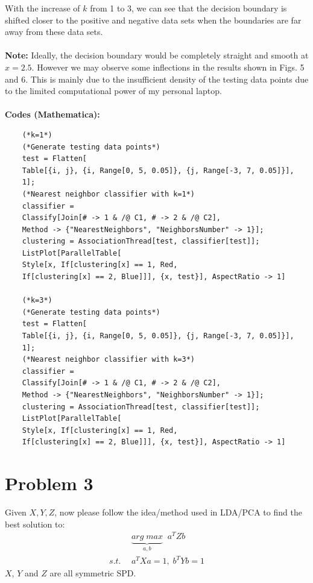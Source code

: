 \documentclass[11pt]{article}
\begin{document}
With the increase of $k$ from 1 to 3, we can see that the decision boundary is shifted closer to the positive and negative data sets when the boundaries are far away from these data sets.\\ \\
\textbf{Note: }Ideally, the decision boundary would be completely straight and smooth at $x=2.5$. However we may observe some inflections in the results shown in Figs. 5 and 6. This is mainly due to the insufficient density of the testing data points due to the limited computational power of my personal laptop.\\ \\
\textbf{Codes (Mathematica): }
\begin{verbatim}
	(*k=1*)
	(*Generate testing data points*)
	test = Flatten[
	Table[{i, j}, {i, Range[0, 5, 0.05]}, {j, Range[-3, 7, 0.05]}], 
	1];
	(*Nearest neighbor classifier with k=1*)
	classifier = 
	Classify[Join[# -> 1 & /@ C1, # -> 2 & /@ C2], 
	Method -> {"NearestNeighbors", "NeighborsNumber" -> 1}];
	clustering = AssociationThread[test, classifier[test]];
	ListPlot[ParallelTable[
	Style[x, If[clustering[x] == 1, Red, 
	If[clustering[x] == 2, Blue]]], {x, test}], AspectRatio -> 1]
	
	(*k=3*)
	(*Generate testing data points*)
	test = Flatten[
	Table[{i, j}, {i, Range[0, 5, 0.05]}, {j, Range[-3, 7, 0.05]}], 
	1];
	(*Nearest neighbor classifier with k=3*)
	classifier = 
	Classify[Join[# -> 1 & /@ C1, # -> 2 & /@ C2], 
	Method -> {"NearestNeighbors", "NeighborsNumber" -> 1}];
	clustering = AssociationThread[test, classifier[test]];
	ListPlot[ParallelTable[
	Style[x, If[clustering[x] == 1, Red, 
	If[clustering[x] == 2, Blue]]], {x, test}], AspectRatio -> 1]
\end{verbatim}

\section*{Problem 3}
Given $X, Y, Z$, now please follow the idea/method used in LDA/PCA to find the best solution to:
\begin{equation}
\begin{aligned}
&\underbrace{arg\;max}_{a,b}\;\;{a^TZb}\\
s.t. \ \ &a^TXa =1,\; b^TYb =1
\end{aligned}
\end{equation}
$X$, $Y$ and $Z$ are all symmetric SPD. \\ \\
\end{document}
